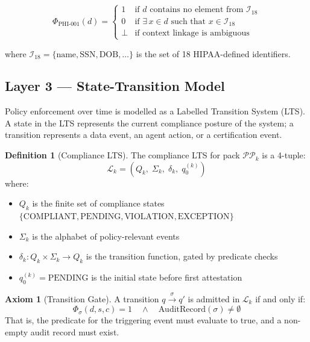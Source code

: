 \documentclass[12pt,letterpaper]{article}
\theoremstyle{definition}
\newtheorem{definition}{Definition}[section]
\newtheorem{axiom}{Axiom}[section]
\theoremstyle{plain}
\theoremstyle{remark}
\begin{document}
\begin{equation}
\Phi_{\text{PHI-001}}(d) =
  \begin{cases}
    1 & \text{if } d \text{ contains no element from } \mathcal{I}_{18} \\
    0 & \text{if } \exists\, x \in d \text{ such that } x \in \mathcal{I}_{18} \\
    \bot & \text{if context linkage is ambiguous}
  \end{cases}
\label{eq:phipred}
\end{equation}

where $\mathcal{I}_{18} = \{ \text{name}, \text{SSN}, \text{DOB}, \ldots \}$ is
the set of 18 HIPAA-defined identifiers.

\subsection{Layer 3 --- State-Transition Model}

Policy enforcement over time is modelled as a Labelled Transition System (LTS).
A state in the LTS represents the current compliance posture of the system; a
transition represents a data event, an agent action, or a certification event.

\begin{definition}[Compliance LTS]
The compliance LTS for pack $\mathcal{PP}_k$ is a 4-tuple:
\begin{equation}
\mathcal{L}_k = (Q_k,\; \Sigma_k,\; \delta_k,\; q_0^{(k)})
\label{eq:lts}
\end{equation}
where:
\begin{itemize}
  \item $Q_k$ is the finite set of compliance states
  $\{\text{COMPLIANT}, \text{PENDING}, \text{VIOLATION}, \text{EXCEPTION}\}$
  \item $\Sigma_k$ is the alphabet of policy-relevant events
  \item $\delta_k : Q_k \times \Sigma_k \rightarrow Q_k$ is the transition
  function, gated by predicate checks
  \item $q_0^{(k)} = \text{PENDING}$ is the initial state before first
  attestation
\end{itemize}
\end{definition}

\begin{axiom}[Transition Gate]
A transition $q \xrightarrow{\sigma} q'$ is admitted in $\mathcal{L}_k$ if and
only if:
\begin{equation}
\Phi_\sigma(d, s, c) = 1 \quad \wedge \quad \text{AuditRecord}(\sigma) \neq
\emptyset
\label{eq:gate}
\end{equation}
That is, the predicate for the triggering event must evaluate to true, and a
non-empty audit record must exist.
\end{axiom}
\end{document}
